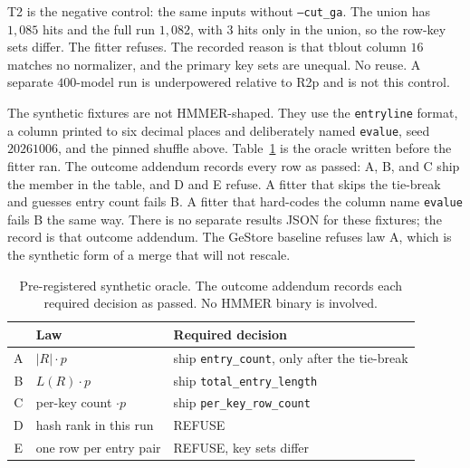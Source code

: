 \documentclass[letterpaper,twocolumn,10pt]{article}
\begin{document}
T2 is the negative control: the same inputs without \texttt{--cut\_ga}.
The union has
$1{,}085$
hits and the full run
$1{,}082$,
with
$3$
hits only in the union, so the row-key sets differ.
The fitter refuses.
The recorded reason is that tblout column
$16$
matches no normalizer, and the primary key sets are unequal.
No reuse.
A separate
$400$-model
run is underpowered relative to R2p and is not this control.

The synthetic fixtures are not HMMER-shaped.
They use the \texttt{entryline} format, a column printed to six decimal places and deliberately named \texttt{evalue}, seed
$20261006$,
and the pinned shuffle above.
Table~\ref{tab:t3} is the oracle written before the fitter ran.
The outcome addendum records every row as passed: A, B, and C ship the member in the table, and D and E refuse.
A fitter that skips the tie-break and guesses entry count fails B.
A fitter that hard-codes the column name \texttt{evalue} fails B the same way.
There is no separate results JSON for these fixtures; the record is that outcome addendum.
The GeStore baseline refuses law A, which is the synthetic form of a merge that will not rescale.

\begin{table}[t]
\caption{Pre-registered synthetic oracle.
The outcome addendum records each required decision as passed.
No HMMER binary is involved.}
\label{tab:t3}
\small
\begin{tabular}{@{}clp{}@{}}
\toprule
& Law & Required decision \\
\midrule
A & $|R|\cdot p$ & ship \texttt{entry\_count}, only after the tie-break \\
B & $L(R)\cdot p$ & ship \texttt{total\_entry\_length} \\
C & per-key count $\cdot p$ & ship \texttt{per\_key\_row\_count} \\
D & hash rank in this run & REFUSE \\
E & one row per entry pair & REFUSE, key sets differ \\
\bottomrule
\end{tabular}
\end{table}
\end{document}
